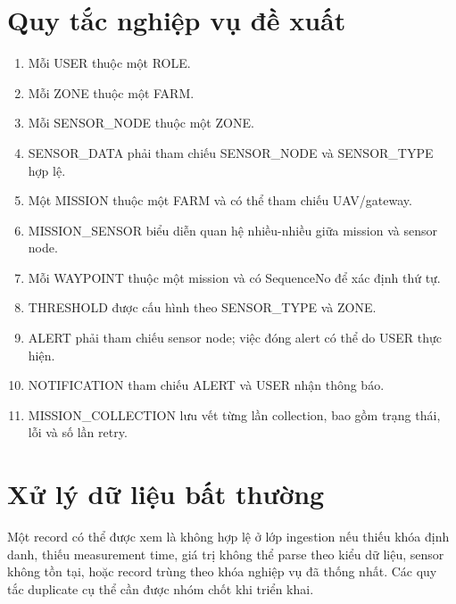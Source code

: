 \section{Quy tắc nghiệp vụ đề xuất}
\begin{enumerate}
  \item Mỗi USER thuộc một ROLE.
  \item Mỗi ZONE thuộc một FARM.
  \item Mỗi SENSOR\_NODE thuộc một ZONE.
  \item SENSOR\_DATA phải tham chiếu SENSOR\_NODE và SENSOR\_TYPE hợp lệ.
  \item Một MISSION thuộc một FARM và có thể tham chiếu UAV/gateway.
  \item MISSION\_SENSOR biểu diễn quan hệ nhiều-nhiều giữa mission và sensor node.
  \item Mỗi WAYPOINT thuộc một mission và có SequenceNo để xác định thứ tự.
  \item THRESHOLD được cấu hình theo SENSOR\_TYPE và ZONE.
  \item ALERT phải tham chiếu sensor node; việc đóng alert có thể do USER thực hiện.
  \item NOTIFICATION tham chiếu ALERT và USER nhận thông báo.
  \item MISSION\_COLLECTION lưu vết từng lần collection, bao gồm trạng thái, lỗi và số lần retry.
\end{enumerate}

\section{Xử lý dữ liệu bất thường}
Một record có thể được xem là không hợp lệ ở lớp ingestion nếu thiếu khóa định danh, thiếu measurement time, giá trị không thể parse theo kiểu dữ liệu, sensor không tồn tại, hoặc record trùng theo khóa nghiệp vụ đã thống nhất. Các quy tắc duplicate cụ thể cần được nhóm chốt khi triển khai.

